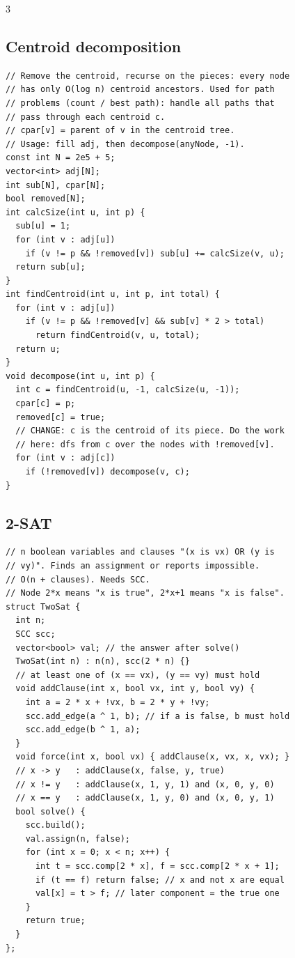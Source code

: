 \documentclass[8pt, a4paper]{article}
\begin{document}
\begin{multicols*}{3}
\subsection{Centroid decomposition}
\begin{lstlisting}
// Remove the centroid, recurse on the pieces: every node
// has only O(log n) centroid ancestors. Used for path
// problems (count / best path): handle all paths that
// pass through each centroid c.
// cpar[v] = parent of v in the centroid tree.
// Usage: fill adj, then decompose(anyNode, -1).
const int N = 2e5 + 5;
vector<int> adj[N];
int sub[N], cpar[N];
bool removed[N];
int calcSize(int u, int p) {
  sub[u] = 1;
  for (int v : adj[u])
    if (v != p && !removed[v]) sub[u] += calcSize(v, u);
  return sub[u];
}
int findCentroid(int u, int p, int total) {
  for (int v : adj[u])
    if (v != p && !removed[v] && sub[v] * 2 > total)
      return findCentroid(v, u, total);
  return u;
}
void decompose(int u, int p) {
  int c = findCentroid(u, -1, calcSize(u, -1));
  cpar[c] = p;
  removed[c] = true;
  // CHANGE: c is the centroid of its piece. Do the work
  // here: dfs from c over the nodes with !removed[v].
  for (int v : adj[c])
    if (!removed[v]) decompose(v, c);
}
\end{lstlisting}
\subsection{2-SAT}
\begin{lstlisting}
// n boolean variables and clauses "(x is vx) OR (y is
// vy)". Finds an assignment or reports impossible.
// O(n + clauses). Needs SCC.
// Node 2*x means "x is true", 2*x+1 means "x is false".
struct TwoSat {
  int n;
  SCC scc;
  vector<bool> val; // the answer after solve()
  TwoSat(int n) : n(n), scc(2 * n) {}
  // at least one of (x == vx), (y == vy) must hold
  void addClause(int x, bool vx, int y, bool vy) {
    int a = 2 * x + !vx, b = 2 * y + !vy;
    scc.add_edge(a ^ 1, b); // if a is false, b must hold
    scc.add_edge(b ^ 1, a);
  }
  void force(int x, bool vx) { addClause(x, vx, x, vx); }
  // x -> y   : addClause(x, false, y, true)
  // x != y   : addClause(x, 1, y, 1) and (x, 0, y, 0)
  // x == y   : addClause(x, 1, y, 0) and (x, 0, y, 1)
  bool solve() {
    scc.build();
    val.assign(n, false);
    for (int x = 0; x < n; x++) {
      int t = scc.comp[2 * x], f = scc.comp[2 * x + 1];
      if (t == f) return false; // x and not x are equal
      val[x] = t > f; // later component = the true one
    }
    return true;
  }
};
\end{lstlisting}

\end{multicols*}
\end{document}

